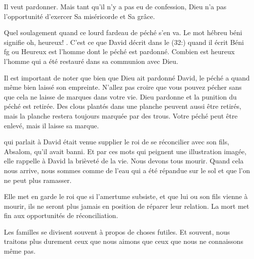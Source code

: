 Il veut pardonner.
 Mais tant qu'il n'y a pas eu de confession,
 Dieu n'a pas l'opportunité d'exercer Sa miséricorde et Sa grâce. 

Quel soulagement quand ce lourd fardeau de péché s'en va.
 Le mot hébreu \og béni \fg{} signifie \og oh, heureux! \fg{}.
 C'est ce que David décrit dans le (32:)
 quand il écrit \og Béni fg{} ou \og Heureux \fg{} est l'homme
 dont le péché est pardonné.
 Combien est heureux l'homme qui a été restauré
 dans sa communion avec Dieu. 

Il est important de noter que bien que Dieu ait pardonné David,
 le péché a quand même bien laissé son empreinte.
 N'allez pas croire que vous pouvez pécher sans que cela ne laisse
 de marques dans votre vie.
 Dieu pardonne et la punition du péché est retirée.
 Des clous plantés dans une planche peuvent aussi être retirés,
 mais la planche restera toujours marquée par des trous.
 Votre péché peut être enlevé, mais il laisse sa marque. 

\dvrule






 qui parlait à David était venue supplier
 le roi de se réconcilier avec son fils, Absalom, qu'il avait banni.
 Et par ces mots qui peignent une illustration imagée, elle rappelle à David
 la brièveté de la vie. Nous devons tous mourir.
 Quand cela nous arrive, nous sommes comme de l'eau qui a été répandue
 sur le sol et que l'on ne peut plus ramasser. 

Elle met en garde le roi que si l'amertume subsiste, et que lui ou son fils
 vienne à mourir, ils ne seront plus jamais en position
 de réparer leur relation.
 La mort met fin aux opportunités de réconciliation. 

Les familles se divisent souvent à propos de choses futiles.
 Et souvent, nous traitons plus durement ceux que nous aimons
 que ceux que nous ne connaissons même pas. 

